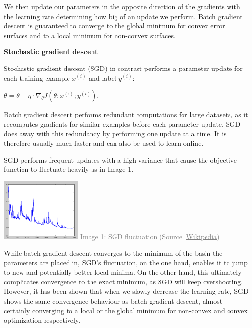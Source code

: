 \documentclass[4pt,journal,compsoc]{IEEEtran}
\begin{document}
\begin{flushleft}
    We then update our parameters in the opposite direction of the gradients with the learning rate determining how big of an update we perform. Batch gradient descent is guaranteed to converge to the global minimum for convex error surfaces and to a local minimum for non-convex surfaces. \newline \newline
    
    \textbf{\Large Stochastic gradient descent} \newline
    
    Stochastic gradient descent (SGD) in contrast performs a parameter update for each training example $x ^ {(i)}$ and label $y ^ {(i)}$: \newline
    
    $\theta = \theta - \eta \cdot \nabla _ \theta J(\theta; x ^ {(i)}; y ^ {(i)})$. \newline
    
    Batch gradient descent performs redundant computations for large datasets, as it recomputes gradients for similar examples before each parameter update. SGD does away with this redundancy by performing one update at a time. It is therefore usually much faster and can also be used to learn online. \newline
    
    SGD performs frequent updates with a high variance that cause the objective function to fluctuate heavily as in Image 1. \newline
    
    \begin{center}
        \includegraphics[width = 4cm]{P002.PNG} \newline
        \textcolor{gray}{Image 1: SGD fluctuation (Source: \underline{Wikipedia})} \newline
    \end{center}
    
    While batch gradient descent converges to the minimum of the basin the parameters are placed in, SGD's fluctuation, on the one hand, enables it to jump to new and potentially better local minima. On the other hand, this ultimately complicates convergence to the exact minimum, as SGD will keep overshooting. However, it has been shown that when we slowly decrease the learning rate, SGD shows the same convergence behaviour as batch gradient descent, almost certainly converging to a local or the global minimum for non-convex and convex optimization respectively. \newline
    

\end{flushleft}
\end{document}
